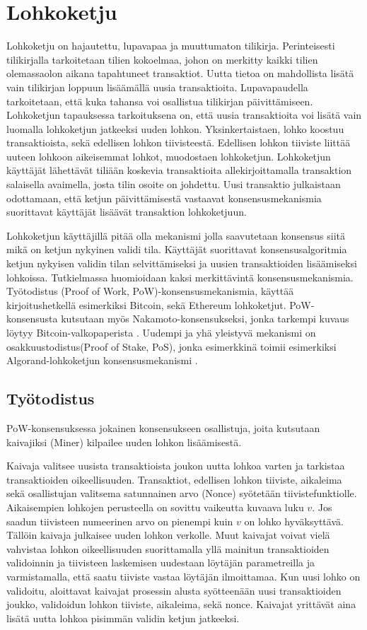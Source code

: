 \section{Lohkoketju}

Lohkoketju on hajautettu, lupavapaa ja muuttumaton tilikirja. Perinteisesti tilikirjalla tarkoitetaan tilien kokoelmaa, johon on merkitty kaikki tilien olemassaolon aikana tapahtuneet transaktiot. Uutta tietoa on mahdollista lisätä vain tilikirjan loppuun lisäämällä uusia transaktioita. Lupavapaudella tarkoitetaan, että kuka tahansa voi osallistua tilikirjan päivittämiseen. Lohkoketjun tapauksessa tarkoituksena on, että uusia  transaktioita voi lisätä vain luomalla lohkoketjun jatkeeksi uuden lohkon. Yksinkertaistaen, lohko koostuu transaktioista, sekä edellisen lohkon tiivisteestä. Edellisen lohkon tiiviste liittää uuteen lohkoon aikeisemmat lohkot, muodostaen lohkoketjun. Lohkoketjun käyttäjät lähettävät tiliään koskevia transaktioita allekirjoittamalla transaktion salaisella avaimella, josta tilin osoite on johdettu. Uusi transaktio julkaistaan odottamaan, että ketjun päivittämisestä vastaavat konsensusmekanismia suorittavat käyttäjät lisäävät transaktion lohkoketjuun.

Lohkoketjun käyttäjillä pitää olla mekanismi jolla saavutetaan konsensus siitä mikä on ketjun nykyinen validi tila. Käyttäjät suorittavat konsensusalgoritmia ketjun nykyisen validin tilan selvittämiseksi ja uusien transaktioiden lisäämiseksi lohkoissa. Tutkielmassa huomioidaan kaksi merkittävintä konsensusmekanismia. Työtodistus (Proof of Work, PoW)-konsensusmekanismia, käyttää kirjoitushetkellä esimerkiksi Bitcoin, sekä Ethereum lohkoketjut. PoW-konsensusta kutsutaan myös Nakamoto-konsensukseksi, jonka tarkempi kuvaus löytyy Bitcoin-valkopaperista \cite{Nakamoto_bitcoin}. Uudempi ja yhä yleistyvä mekanismi on  osakkuustodistus(Proof of Stake, PoS), jonka esimerkkinä toimii esimerkiksi Algorand-lohkoketjun konsensusmekanismi \cite{gilad_algorand_2017}. 

\subsection{Työtodistus}
PoW-konsensuksessa jokainen konsensukseen osallistuja, joita kutsutaan kaivajiksi (Miner) kilpailee uuden lohkon lisäämisestä.

Kaivaja valitsee uusista transaktioista joukon uutta lohkoa varten ja tarkistaa transaktioiden oikeellisuuden. Transaktiot, edellisen lohkon tiiviste, aikaleima sekä osallistujan valitsema satunnainen arvo (Nonce) syötetään tiivistefunktiolle. Aikaisempien lohkojen perusteella on sovittu vaikeutta kuvaava luku $v$. Jos saadun tiivisteen numeerinen arvo on pienempi kuin $v$ on lohko hyväksyttävä. Tällöin kaivaja julkaisee uuden lohkon verkolle. Muut kaivajat voivat vielä vahvistaa lohkon oikeellisuuden suorittamalla yllä mainitun transaktioiden validoinnin ja tiivisteen laskemisen uudestaan löytäjän parametreilla ja varmistamalla, että saatu tiiviste vastaa löytäjän ilmoittamaa. Kun uusi lohko on validoitu, aloittavat kaivajat prosessin alusta syötteenään uusi transaktioiden joukko, validoidun lohkon tiiviste, aikaleima, sekä nonce. Kaivajat yrittävät aina lisätä uutta lohkoa pisimmän validin ketjun jatkeeksi. 


